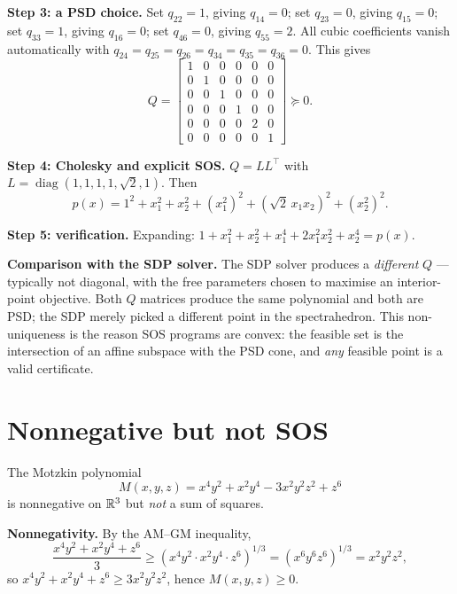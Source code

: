\documentclass[11pt]{article}
\begin{document}
\medskip\noindent\textbf{Step 3: a PSD choice.}
Set $q_{22}=1$, giving $q_{14}=0$; set $q_{23}=0$, giving $q_{15}=0$;
set $q_{33}=1$, giving $q_{16}=0$; set $q_{46}=0$, giving $q_{55}=2$.
All cubic coefficients vanish automatically with $q_{24}=q_{25}=q_{26}=
q_{34}=q_{35}=q_{36}=0$. This gives
\begin{equation}
  Q = \begin{bmatrix}
    1 & 0 & 0 & 0 & 0 & 0 \\
    0 & 1 & 0 & 0 & 0 & 0 \\
    0 & 0 & 1 & 0 & 0 & 0 \\
    0 & 0 & 0 & 1 & 0 & 0 \\
    0 & 0 & 0 & 0 & 2 & 0 \\
    0 & 0 & 0 & 0 & 0 & 1
  \end{bmatrix} \succeq 0.
\end{equation}

\medskip\noindent\textbf{Step 4: Cholesky and explicit SOS.}
$Q = L L^\top$ with $L = \operatorname{diag}(1,1,1,1,\sqrt{2},1)$. Then
\begin{equation}
  p(x) = 1^2 + x_1^2 + x_2^2 + (x_1^2)^2 + (\sqrt{2}\,x_1 x_2)^2 + (x_2^2)^2.
\end{equation}

\medskip\noindent\textbf{Step 5: verification.}
Expanding: $1 + x_1^2 + x_2^2 + x_1^4 + 2x_1^2 x_2^2 + x_2^4 = p(x)$.

\medskip\noindent\textbf{Comparison with the SDP solver.}
The SDP solver produces a \emph{different} $Q$ --- typically not diagonal,
with the free parameters chosen to maximise an interior-point objective.
Both $Q$ matrices produce the same polynomial and both are PSD; the SDP
merely picked a different point in the spectrahedron. This non-uniqueness
is the reason SOS programs are convex: the feasible set is the intersection
of an affine subspace with the PSD cone, and \emph{any} feasible point is
a valid certificate.

\section{Nonnegative but not SOS}
The Motzkin polynomial \cite{Motzkin1967}
\begin{equation}\label{eq:motzkin}
  M(x,y,z) = x^4 y^2 + x^2 y^4 - 3x^2 y^2 z^2 + z^6
\end{equation}
is nonnegative on $\mathbb{R}^3$ but \emph{not} a sum of squares.

\medskip\noindent\textbf{Nonnegativity.} By the AM--GM inequality,
\begin{equation}
  \frac{x^4 y^2 + x^2 y^4 + z^6}{3}
  \ge (x^4 y^2 \cdot x^2 y^4 \cdot z^6)^{1/3}
  = (x^6 y^6 z^6)^{1/3} = x^2 y^2 z^2,
\end{equation}
so $x^4 y^2 + x^2 y^4 + z^6 \ge 3x^2 y^2 z^2$, hence $M(x,y,z) \ge 0$.
\end{document}
